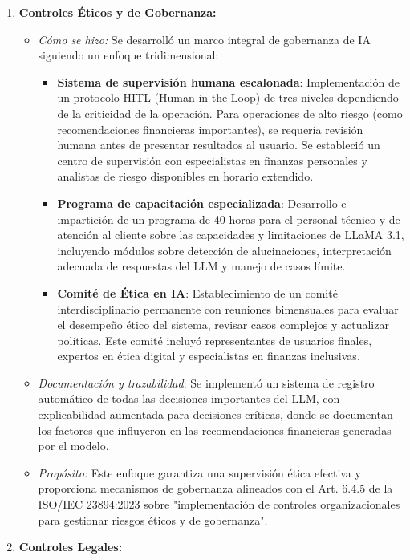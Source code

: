 \documentclass[12pt]{article}
\begin{document}
\begin{enumerate}
\begin{itemize}
        \end{itemize}
    \item \textbf{Controles Éticos y de Gobernanza:}
        \begin{itemize}
            \item \textit{Cómo se hizo:} Se desarrolló un marco integral de gobernanza de IA siguiendo un enfoque tridimensional:
            \begin{itemize}
                \item \textbf{Sistema de supervisión humana escalonada}: Implementación de un protocolo HITL (Human-in-the-Loop) de tres niveles dependiendo de la criticidad de la operación. Para operaciones de alto riesgo (como recomendaciones financieras importantes), se requería revisión humana antes de presentar resultados al usuario. Se estableció un centro de supervisión con especialistas en finanzas personales y analistas de riesgo disponibles en horario extendido.
                \item \textbf{Programa de capacitación especializada}: Desarrollo e impartición de un programa de 40 horas para el personal técnico y de atención al cliente sobre las capacidades y limitaciones de LLaMA 3.1, incluyendo módulos sobre detección de alucinaciones, interpretación adecuada de respuestas del LLM y manejo de casos límite.
                \item \textbf{Comité de Ética en IA}: Establecimiento de un comité interdisciplinario permanente con reuniones bimensuales para evaluar el desempeño ético del sistema, revisar casos complejos y actualizar políticas. Este comité incluyó representantes de usuarios finales, expertos en ética digital y especialistas en finanzas inclusivas.
            \end{itemize}
            \item \textit{Documentación y trazabilidad}: Se implementó un sistema de registro automático de todas las decisiones importantes del LLM, con explicabilidad aumentada para decisiones críticas, donde se documentan los factores que influyeron en las recomendaciones financieras generadas por el modelo.
            \item \textit{Propósito:} Este enfoque garantiza una supervisión ética efectiva y proporciona mecanismos de gobernanza alineados con el Art. 6.4.5 de la ISO/IEC 23894:2023 sobre "implementación de controles organizacionales para gestionar riesgos éticos y de gobernanza".
        \end{itemize}
    \item \textbf{Controles Legales:}

\end{enumerate}
\end{document}

